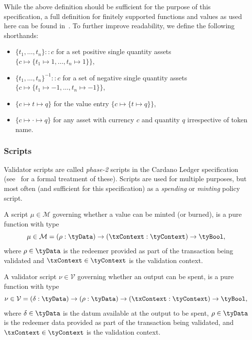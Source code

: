While the above definition should be sufficient for the purpose of this
specification, a full definition for finitely supported functions and values as
used here can be found in~\cite{utxo-ma}. To further improve readability, we
define the following shorthands:
\begin{itemize}
	\item $\{t_1, \ldots, t_n\} :: c$ for a set positive single quantity assets
	      $\{c \mapsto \{t_1 \mapsto 1, \ldots, t_n \mapsto 1\}\}$,
	\item ${\{t_1, \ldots, t_n\}}^{-1} :: c$ for a set of negative single quantity assets
	      $\{c \mapsto \{t_1 \mapsto -1, \ldots, t_n \mapsto -1\}\}$,

	\item $\{c \mapsto t \mapsto q\}$ for the value entry $\{c \mapsto \{t \mapsto q\}\}$,
	\item $\{c \mapsto \cdot \mapsto q \}$ for any asset with currency $c$ and
	      quantity $q$ irrespective of token name.
\end{itemize}

\subsubsection{Scripts}

Validator scripts are called \emph{phase-2} scripts in the Cardano Ledger
specification (see~\cite{ledger-alonzo-spec} for a formal treatment of these). Scripts
are used for multiple purposes, but most often (and sufficient for this
specification) as a \emph{spending} or \emph{minting} policy script.

\begin{definition}
	A script $\mu \in \mathcal{M}$ governing whether a value can be minted (or
	burned), is a pure function with type
	\[
		\mu \in \mathcal{M} = (\rho : \tyData) \to (\txContext : \tyContext) \to\tyBool,
	\]
	where $\rho \in \tyData$ is the redeemer provided as part of the transaction
	being validated and $\txContext \in \tyContext$ is the validation
	context.
\end{definition}

\begin{definition}
	A validator script $\nu \in \mathcal{V}$ governing whether an output can be
	spent, is a pure function with type
	\[
		\nu \in \mathcal{V} = (\delta : \tyData) \to (\rho : \tyData) \to (\txContext : \tyContext) \to\tyBool,
	\]
	where $\delta \in \tyData$ is the datum available at the output to be spent,
	$\rho \in \tyData$ is the redeemer data provided as part of the transaction
	being validated, and $\txContext \in \tyContext$ is the validation
	context.
\end{definition}

